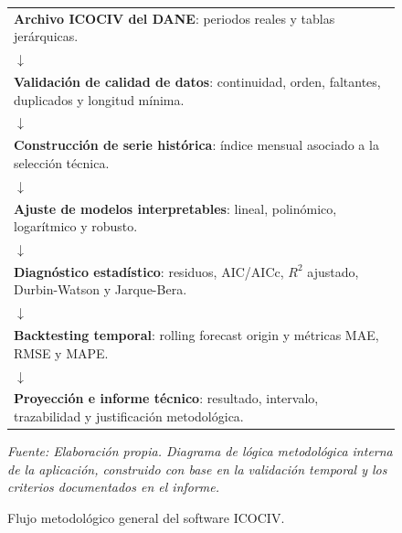 ﻿\begin{figure}[H]
\centering
\begingroup
\small
\setlength{\tabcolsep}{8pt}
\renewcommand{\arraystretch}{1.25}
\begin{tabular}{p{}}
\toprule
\textbf{Archivo ICOCIV del DANE}: periodos reales y tablas jerárquicas. \\
\(\downarrow\) \\
\textbf{Validación de calidad de datos}: continuidad, orden, faltantes, duplicados y longitud mínima. \\
\(\downarrow\) \\
\textbf{Construcción de serie histórica}: índice mensual asociado a la selección técnica. \\
\(\downarrow\) \\
\textbf{Ajuste de modelos interpretables}: lineal, polinómico, logarítmico y robusto. \\
\(\downarrow\) \\
\textbf{Diagnóstico estadístico}: residuos, AIC/AICc, \(R^2\) ajustado, Durbin-Watson y Jarque-Bera. \\
\(\downarrow\) \\
\textbf{Backtesting temporal}: rolling forecast origin y métricas MAE, RMSE y MAPE. \\
\(\downarrow\) \\
\textbf{Proyección e informe técnico}: resultado, intervalo, trazabilidad y justificación metodológica. \\
\bottomrule
\end{tabular}
\endgroup
\par\footnotesize\textit{Fuente: Elaboración propia. Diagrama de lógica metodológica interna de la aplicación, construido con base en la validación temporal y los criterios documentados en el informe.}\normalsize
\caption{Flujo metodológico general del software ICOCIV.}
\label{fig:flujo_metodologico}
\end{figure}
